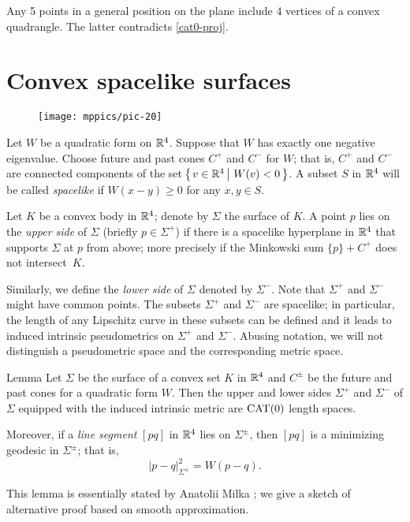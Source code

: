 \documentclass{article}
\begin{document}
Any 5 points in a general position on the plane include 4 vertices of a convex quadrangle.
The latter contradicts \ref{cat0-proj}.
\qeds

\section{Convex spacelike surfaces}

\begin{wrapfigure}{r}{55mm}
\vskip-4mm
\centering
\texttt{[image: mppics/pic-20]}
\end{wrapfigure}

Let $W$ be a quadratic form on $\mathbb{R}^4$.
Suppose that  $W$ has exactly one negative eigenvalue.
Choose future and past cones $C^+$ and $C^-$ for $W$;
that is, $C^+$ and $C^-$ are connected components of the set
$\set{v\in\RR^4}{W(v)< 0}$.
A subset $S$ in $\mathbb{R}^4$ will be called \emph{spacelike} if $W(x-y)\ge 0$ for any $x,y\in S$.

Let $K$ be a convex body in $\mathbb{R}^4$;
denote by $\Sigma$ the surface of $K$. 
A point $p$ lies on the \emph{upper side} of $\Sigma$ (briefly $p\in\Sigma^+$) if there is a spacelike hyperplane in $\mathbb{R}^4$ that supports $\Sigma$ at $p$ from above;
more precisely if the Minkowski sum $\{p\}+C^+$ does not intersect~$K$.

Similarly, we define the \emph{lower side} of $\Sigma$ denoted by $\Sigma^-$.
Note that $\Sigma^+$ and $\Sigma^-$ might have common points.
The subsets $\Sigma^+$ and $\Sigma^-$ are spacelike;
in particular, the length of any Lipschitz curve in these subsets can be defined and it leads to induced intrinsic pseudometrics on $\Sigma^+$ and $\Sigma^-$.
Abusing notation, we will not distinguish a pseudometric space and the corresponding metric space. 

\begin{thm}{Lemma}\label{lem:sides}
Let $\Sigma$ be the surface of a convex set $K$ in $\mathbb{R}^4$ and $C^\pm$ be the future and past cones for a quadratic form $W$.
Then the upper and lower sides $\Sigma^+$ and $\Sigma^-$ of $\Sigma$ equipped with the induced intrinsic metric are $\mathrm{CAT}(0)$ length spaces.

Moreover, if a \emph{line segment} $[pq]$ in $\mathbb{R}^4$ 
lies on $\Sigma^\pm$, then $[pq]$ is a minimizing geodesic in $\Sigma^\pm$; that is,
\[|p-q|_{\Sigma^\pm}^2=W(p-q).\]

\end{thm}

This lemma is essentially stated by Anatolii Milka \cite[Theorem~4]{milka}; we give a sketch of alternative proof based on smooth approximation.
\end{document}
